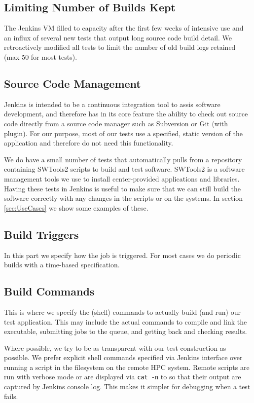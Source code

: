 \documentclass[10pt, conference, compsocconf]{IEEEtran}
\begin{document}
\subsection{Limiting Number of Builds Kept}
The Jenkins VM filled to capacity after the first few weeks of intensive use and an influx of several new tests that output long source code build detail.
We retroactively modified all tests to limit the number of old build logs retained (max 50 for most tests). 

\subsection{Source Code Management}
Jenkins is intended to be a continuous integration tool to assis software development, and therefore has in its core feature the ability to check out source code directly from a source code manager such as Subversion or Git (with plugin).
For our purpose, most of our tests use a specified, static version of the application and therefore do not need this functionality. 

We do have a small number of tests that automatically pulls from a repository containing SWTools2 scripts to build and test software. 
SWTools2 is a software management tools we use to install center-provided applications and libraries. Having these tests in Jenkins is useful to make sure that we can still build the software correctly with any changes in the scripts or on the systems. 
In section \ref{sec:UseCases} we show some examples of these.

\subsection{Build Triggers}
In this part we specify how the job is triggered. 
For most cases we do periodic builds with a time-based specification.

\subsection{Build Commands}
This is where we specify the (shell) commands to actually build (and run) our test application. 
This may include the actual commands to compile and link the executable, submitting jobs to the queue, and getting back and checking results.

Where possible, we try to be as transparent with our test construction as possible. 
We prefer explicit shell commands specified via Jenkins interface over running a script in the filesystem on the remote HPC system. 
Remote scripts are run with verbose mode or are displayed via \texttt{cat -n} to so that their output are captured by Jenkins console log. 
This makes it simpler for debugging when a test fails.
\end{document}
